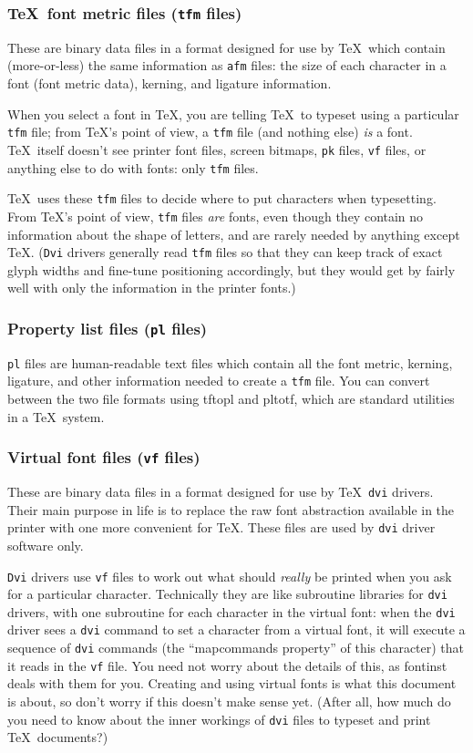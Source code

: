 \documentclass[a4paper]{ltxguide}
\newcommand*{\setfilename}[1]{\texttt{#1}}
\newcommand*{\setpackagename}[1]{\textsf{#1}}
\newcommand{\fontinst}{\setpackagename{font\-inst}\xspace}
\newcommand{\vf} {\setfilename{vf}\xspace}
\newcommand{\pl} {\setfilename{pl}\xspace}
\newcommand{\pk} {\setfilename{pk}\xspace}
\newcommand{\afm}{\setfilename{afm}\xspace}
\newcommand{\tfm}{\setfilename{tfm}\xspace}
\newcommand{\dvi}{\setfilename{dvi}\xspace}
\newcommand{\Dvi}{\setfilename{Dvi}\xspace}
\newcommand{\pltotf}{\setpackagename{pltotf}\xspace}
\newcommand{\tftopl}{\setpackagename{tftopl}\xspace}
\begin{document}
\subsubsection{\TeX\ font metric files (\tfm files)}

These are binary data files in a format designed for use by \TeX\
which contain (more-or-less) the same information as \afm files:
the size of each character in a font (font metric data), kerning,
and ligature information.

When you select a font in \TeX, you are telling \TeX\ to typeset
using a particular \tfm file; from \TeX's point of view, a \tfm
file (and nothing else) \emph{is} a font.  \TeX\ itself doesn't
see printer font files, screen bitmaps, \pk files, \vf files, or
anything else to do with fonts: only \tfm files.

\TeX\ uses these \tfm files to decide where to put characters when
typesetting.  From \TeX's point of view, \tfm files \emph{are} 
fonts, even though they contain no information about the shape of
letters, and are rarely needed by anything except \TeX. (\Dvi drivers 
generally read \tfm files so that they can keep track of exact glyph 
widths and fine-tune positioning accordingly, but they would get by 
fairly well with only the information in the printer fonts.)


\subsubsection{Property list files (\pl files)}

\pl files are human-readable text files which contain all the font
metric, kerning, ligature, and other information needed to create
a \tfm file.  You can convert between the two file formats using
\tftopl and \pltotf, which are standard utilities in a \TeX\ system.


\subsubsection{Virtual font files (\vf files)}

These are binary data files in a format designed for use by \TeX\
\dvi drivers.  Their main purpose in life is to replace the raw font 
abstraction available in the printer with one more convenient for 
\TeX. These files are used by \dvi driver software only.

\Dvi drivers use \vf files to work out what should \emph{really} be 
printed when you ask for a particular character. 
Technically they are like subroutine libraries for \dvi drivers, 
with one subroutine for each character in the virtual font: when 
the \dvi driver sees a \dvi command to set a character from a virtual 
font, it will execute a sequence of \dvi commands (the ``mapcommands 
property'' of this character) that it reads in the \vf file. You need 
not worry about the details of this, as \fontinst deals with them for 
you. Creating and using virtual fonts is what this document is about,
so don't worry if this doesn't make sense yet. (After all, how much 
do you need to know about the inner workings of \dvi files to typeset 
and print \TeX\ documents?)
\end{document}
